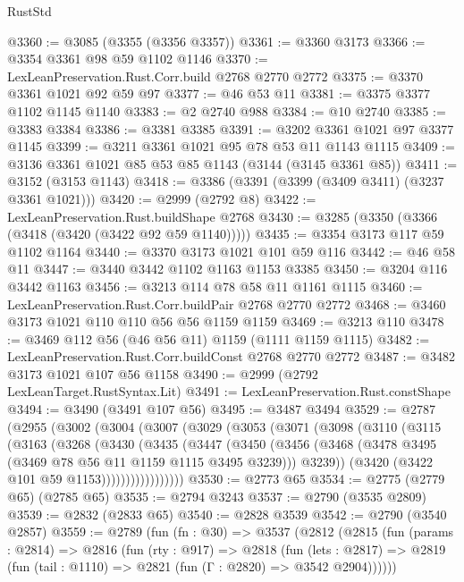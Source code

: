 \begin{lexlean}{RustStd}
\begin{coremodule}
{\begin{coremodule}
{{{{{{{{{{{{{{{{{{{{{{{{{{@3360 := @3085 (@3355 (@3356 @3357))
@3361 := @3360 @3173
@3366 := @3354 @3361 @98 @59 @1102 @1146
@3370 := LexLeanPreservation.Rust.Corr.build @2768 @2770 @2772
@3375 := @3370 @3361 @1021 @92 @59 @97
@3377 := @46 @53 @11
@3381 := @3375 @3377 @1102 @1145 @1140
@3383 := @2 @2740 @988
@3384 := @10 @2740
@3385 := @3383 @3384
@3386 := @3381 @3385
@3391 := @3202 @3361 @1021 @97 @3377 @1145
@3399 := @3211 @3361 @1021 @95 @78 @53 @11 @1143 @1115
@3409 := @3136 @3361 @1021 @85 @53 @85 @1143 (@3144 (@3145 @3361 @85))
@3411 := @3152 (@3153 @1143)
@3418 := @3386 (@3391 (@3399 (@3409 @3411) (@3237 @3361 @1021)))
@3420 := @2999 (@2792 @8)
@3422 := LexLeanPreservation.Rust.buildShape @2768
@3430 := @3285 (@3350 (@3366 (@3418 (@3420 (@3422 @92 @59 @1140)))))
@3435 := @3354 @3173 @117 @59 @1102 @1164
@3440 := @3370 @3173 @1021 @101 @59 @116
@3442 := @46 @58 @11
@3447 := @3440 @3442 @1102 @1163 @1153 @3385
@3450 := @3204 @116 @3442 @1163
@3456 := @3213 @114 @78 @58 @11 @1161 @1115
@3460 := LexLeanPreservation.Rust.Corr.buildPair @2768 @2770 @2772
@3468 := @3460 @3173 @1021 @110 @110 @56 @56 @1159 @1159
@3469 := @3213 @110
@3478 := @3469 @112 @56 (@46 @56 @11) @1159 (@1111 @1159 @1115)
@3482 := LexLeanPreservation.Rust.Corr.buildConst @2768 @2770 @2772
@3487 := @3482 @3173 @1021 @107 @56 @1158
@3490 := @2999 (@2792 LexLeanTarget.RustSyntax.Lit)
@3491 := LexLeanPreservation.Rust.constShape
@3494 := @3490 (@3491 @107 @56)
@3495 := @3487 @3494
@3529 := @2787
    (@2955
      (@3002
        (@3004
          (@3007
            (@3029
              (@3053
                (@3071
                  (@3098
                    (@3110
                      (@3115
                        (@3163
                          (@3268
                            (@3430
                              (@3435
                                (@3447
                                  (@3450
                                    (@3456
                                      (@3468
                                        (@3478 @3495 (@3469 @78 @56 @11 @1159 @1115 @3495 @3239)))
                                      @3239))
                                  (@3420 (@3422 @101 @59 @1153)))))))))))))))))
@3530 := @2773 @65
@3534 := @2775 (@2779 @65) (@2785 @65)
@3535 := @2794 @3243
@3537 := @2790 (@3535 @2809)
@3539 := @2832 (@2833 @65)
@3540 := @2828 @3539
@3542 := @2790 (@3540 @2857)
@3559 := @2789
    (fun (fn : @30) =>
    @3537
      (@2812
        (@2815
          (fun (params : @2814) =>
          @2816
            (fun (rty : @917) =>
            @2818
              (fun (lets : @2817) =>
              @2819 (fun (tail : @1110) => @2821 (fun (Γ : @2820) => @3542 @2904))))))
}}}}}}}}}}}}}}}}}}}}}}}}}}
\end{coremodule}}
\end{coremodule}
\end{lexlean}

